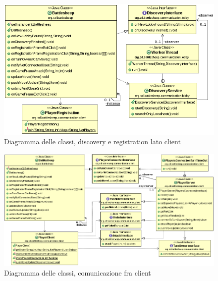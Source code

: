 \documentclass[a4paper,10pt]{scrartcl}
\begin{document}
\begin{figure}[!ht]
    \centering
\includegraphics[width=1.0\textwidth]{core/imgs/UML/RegistrationBattlesheepCommunicationUML-noattr.png}
    \caption{Diagramma delle classi, discovery e registration lato client}
    \label{fig:classlobbyclientside}
\end{figure}

\begin{figure}[!ht]
    \centering
\includegraphics[width=1.0\textwidth]{core/imgs/UML/GameBattlesheepCommunicationUML-noattr.png}
    \caption{Diagramma delle classi, comunicazione fra client}
    \label{fig:classgame}
\end{figure}
\end{document}
